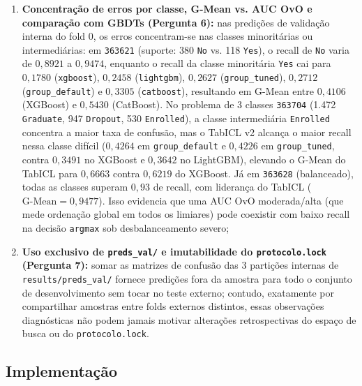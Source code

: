 \documentclass[11pt,a4paper]{article}
\begin{document}
\begin{enumerate}[leftmargin=2em]
    \item \textbf{Concentração de erros por classe, G-Mean vs. AUC OvO e comparação com GBDTs (Pergunta 6):} nas predições de validação interna do fold 0, os erros concentram-se nas classes minoritárias ou intermediárias: em \texttt{363621} (suporte: 380 \texttt{No} vs. 118 \texttt{Yes}), o recall de \texttt{No} varia de $0{,}8921$ a $0{,}9474$, enquanto o recall da classe minoritária \texttt{Yes} cai para $0{,}1780$ (\texttt{xgboost}), $0{,}2458$ (\texttt{lightgbm}), $0{,}2627$ (\texttt{group\_tuned}), $0{,}2712$ (\texttt{group\_default}) e $0{,}3305$ (\texttt{catboost}), resultando em G-Mean entre $0{,}4106$ (XGBoost) e $0{,}5430$ (CatBoost). No problema de 3 classes \texttt{363704} (1.472 \texttt{Graduate}, 947 \texttt{Dropout}, 530 \texttt{Enrolled}), a classe intermediária \texttt{Enrolled} concentra a maior taxa de confusão, mas o TabICL v2 alcança o maior recall nessa classe difícil ($0{,}4264$ em \texttt{group\_default} e $0{,}4226$ em \texttt{group\_tuned}, contra $0{,}3491$ no XGBoost e $0{,}3642$ no LightGBM), elevando o G-Mean do TabICL para $0{,}6663$ contra $0{,}6219$ do XGBoost. Já em \texttt{363628} (balanceado), todas as classes superam $0{,}93$ de recall, com liderança do TabICL ($\text{G-Mean} = 0{,}9477$). Isso evidencia que uma AUC OvO moderada/alta (que mede ordenação global em todos os limiares) pode coexistir com baixo recall na decisão \texttt{argmax} sob desbalanceamento severo;
    \item \textbf{Uso exclusivo de \texttt{preds\_val/} e imutabilidade do \texttt{protocolo.lock} (Pergunta 7):} somar as matrizes de confusão das 3 partições internas de \texttt{results/preds\_val/} fornece predições fora da amostra para todo o conjunto de desenvolvimento sem tocar no teste externo; contudo, exatamente por compartilhar amostras entre folds externos distintos, essas observações diagnósticas não podem jamais motivar alterações retrospectivas do espaço de busca ou do \texttt{protocolo.lock}.
\end{enumerate}

\subsection{Implementação}
\label{sec:implementacao}
\end{document}
